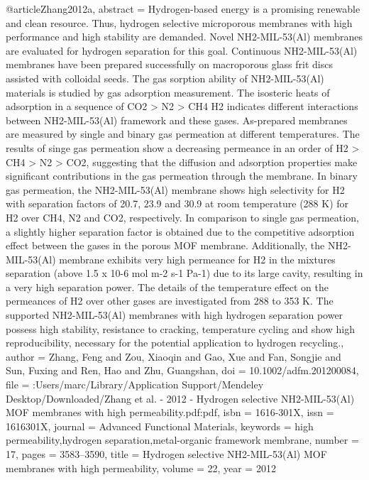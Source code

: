 @article{Zhang2012a,
abstract = {Hydrogen-based energy is a promising renewable and clean resource. Thus, hydrogen selective microporous membranes with high performance and high stability are demanded. Novel NH2-MIL-53(Al) membranes are evaluated for hydrogen separation for this goal. Continuous NH2-MIL-53(Al) membranes have been prepared successfully on macroporous glass frit discs assisted with colloidal seeds. The gas sorption ability of NH2-MIL-53(Al) materials is studied by gas adsorption measurement. The isosteric heats of adsorption in a sequence of CO2 {\textgreater} N2 {\textgreater} CH4 H2 indicates different interactions between NH2-MIL-53(Al) framework and these gases. As-prepared membranes are measured by single and binary gas permeation at different temperatures. The results of singe gas permeation show a decreasing permeance in an order of H2 {\textgreater} CH4 {\textgreater} N2 {\textgreater} CO2, suggesting that the diffusion and adsorption properties make significant contributions in the gas permeation through the membrane. In binary gas permeation, the NH2-MIL-53(Al) membrane shows high selectivity for H2 with separation factors of 20.7, 23.9 and 30.9 at room temperature (288 K) for H2 over CH4, N2 and CO2, respectively. In comparison to single gas permeation, a slightly higher separation factor is obtained due to the competitive adsorption effect between the gases in the porous MOF membrane. Additionally, the NH2-MIL-53(Al) membrane exhibits very high permeance for H2 in the mixtures separation (above 1.5 x 10-6 mol m-2 s-1 Pa-1) due to its large cavity, resulting in a very high separation power. The details of the temperature effect on the permeances of H2 over other gases are investigated from 288 to 353 K. The supported NH2-MIL-53(Al) membranes with high hydrogen separation power possess high stability, resistance to cracking, temperature cycling and show high reproducibility, necessary for the potential application to hydrogen recycling.},
author = {Zhang, Feng and Zou, Xiaoqin and Gao, Xue and Fan, Songjie and Sun, Fuxing and Ren, Hao and Zhu, Guangshan},
doi = {10.1002/adfm.201200084},
file = {:Users/marc/Library/Application Support/Mendeley Desktop/Downloaded/Zhang et al. - 2012 - Hydrogen selective NH2-MIL-53(Al) MOF membranes with high permeability.pdf:pdf},
isbn = {1616-301X},
issn = {1616301X},
journal = {Advanced Functional Materials},
keywords = {high permeability,hydrogen separation,metal-organic framework membrane},
number = {17},
pages = {3583--3590},
title = {{Hydrogen selective NH2-MIL-53(Al) MOF membranes with high permeability}},
volume = {22},
year = {2012}
}
